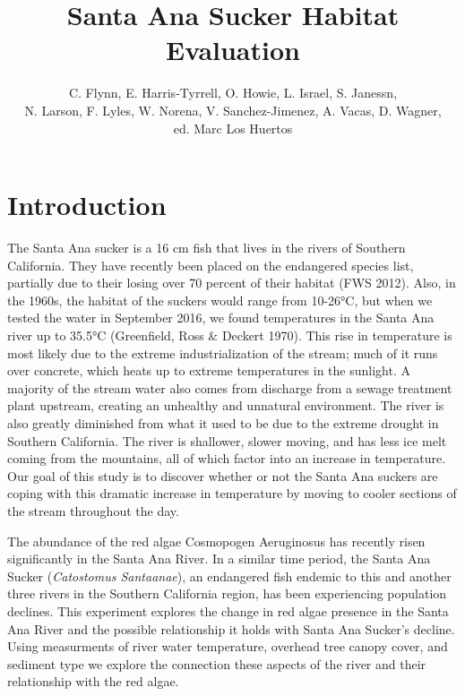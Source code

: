\documentclass{article}\usepackage[]{graphicx}\usepackage[]{color}
\title{Santa Ana Sucker Habitat Evaluation}
\author{C. Flynn, E. Harris-Tyrrell, O. Howie, L. Israel, S. Janessn, \\N. Larson, F. Lyles, W. Norena, V. Sanchez-Jimenez, A. Vacas, D. Wagner,\\ ed. Marc Los Huertos}
\begin{document}
\maketitle

\newpage
\tableofcontents
\newpage

\section{Introduction}

The Santa Ana sucker is a 16 cm fish that lives in the rivers of Southern California.  They have recently been placed on the endangered species list, partially due to their losing over 70 percent of their habitat (FWS 2012). Also, in the 1960s, the habitat of the suckers would range from 10-26°C, but when we tested the water in September 2016, we found temperatures in the Santa Ana river up to 35.5°C (Greenfield, Ross \& Deckert 1970).  This rise in temperature is most likely due to the extreme industrialization of the stream; much of it runs over concrete, which heats up to extreme temperatures in the sunlight.  A majority of the stream water also comes from discharge from a sewage treatment plant upstream, creating an unhealthy and unnatural environment.  The river is also greatly diminished from what it used to be due to the extreme drought in Southern California.  The river is shallower, slower moving, and has less ice melt coming from the mountains, all of which factor into an increase in temperature.  Our goal of this study is to discover whether or not the Santa Ana suckers are coping with this dramatic increase in temperature by moving to cooler sections of the stream throughout the day.  



The abundance of the red algae Cosmopogen Aeruginosus has recently risen significantly in the Santa Ana River. In a similar time period, the Santa Ana Sucker (\emph{Catostomus Santaanae}), an endangered fish endemic to this and another three rivers in the Southern California region, has been experiencing population declines. This experiment explores the change in red algae presence in the Santa Ana River and the possible relationship it holds with Santa Ana Sucker's decline. Using measurments of river water temperature, overhead tree canopy cover, and sediment type we explore the connection these aspects of the river and their relationship with the red algae.
\end{document}

